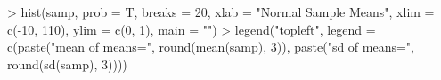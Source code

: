 \begin{Schunk}
\begin{Sinput}
> hist(samp, prob = T, breaks = 20, xlab = "Normal Sample Means", 
      xlim = c(-10, 110), ylim = c(0, 1), main = "")
> legend("topleft", legend = c(paste("mean of means=", 
      round(mean(samp), 3)), paste("sd of means=", 
      round(sd(samp), 3))))
\end{Sinput}
\end{Schunk}
